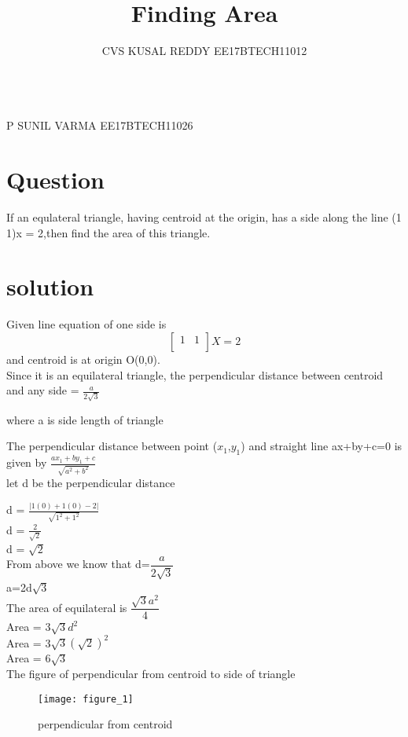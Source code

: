\documentclass[20pt]{article}
\begin{document}
\title{Finding Area}
\maketitle
\author{CVS KUSAL REDDY EE17BTECH11012}\\{P SUNIL VARMA EE17BTECH11026}



\section{Question}
 If an equlateral triangle, having centroid at the
origin, has a side along the line
(1 1)x = 2,then find the area of this triangle. 
\section{solution}
Given line equation of one side is \\
\[ 
\begin{bmatrix}
 1 & 1 \\
\end{bmatrix}X = 2
\]
 and centroid is at origin O(0,0).\\
 Since it is an equilateral triangle,
 the perpendicular distance between centroid and any side = $\frac{a}{2\sqrt{3}}$     
\begin{flushright}
 where a is side length of triangle
\end{flushright} 
The perpendicular distance between point ($x_{1}$,$y_{1}$)  and straight line ax+by+c=0 
is given by $\frac{ax_{1} +by_{1}+c}{\sqrt{a^{2}+b^{2}}}$ \\ 
let d be the perpendicular distance \\
\begin{center}
d = $\frac{|1(0)+1(0)-2|}{\sqrt{1^{2}+1^{2}}}$\\
\singlespacing
 d = $\frac{2}{\sqrt{2}}$\\
\singlespacing
  d = $\sqrt{2}$    \\
\singlespacing
 From above we know that
\singlespacing
d=$\dfrac{a}{2\sqrt{3}}$\\
\singlespacing 
   a=2d$\sqrt{3}$\\
\singlespacing
The area of equilateral is $\dfrac{\sqrt{3}a^{2}}{4}$ \\
\singlespacing  
  Area  = 3$\sqrt{3}d^{2}$  \\
\singlespacing 
  Area = 3$\sqrt{3}(\sqrt{2})^{2}$\\
\singlespacing  
  Area = 6$\sqrt{3}$\\
\singlespacing
The figure of perpendicular from centroid to side of triangle
 
\end{center}
\begin{figure}[h]
\texttt{[image: figure\_1]}
\caption{perpendicular from centroid}
\end{figure}
  
\end{document}
